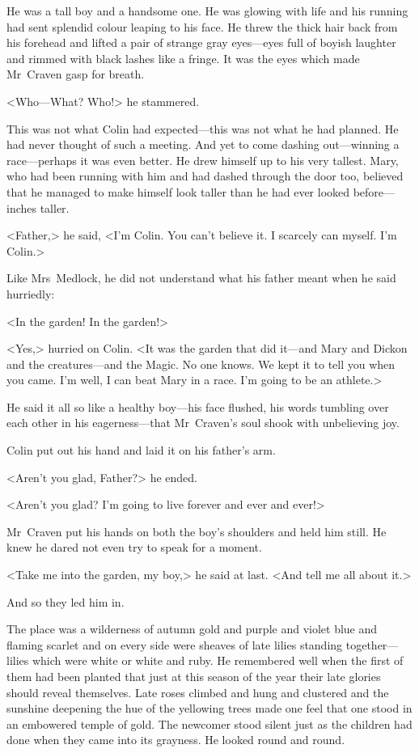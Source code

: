 He was a tall boy and a handsome one. He was glowing with life and his running had sent splendid colour leaping to his face. He threw the thick hair back from his forehead and lifted a pair of strange gray eyes—eyes full of boyish laughter and rimmed with black lashes like a fringe. It was the eyes which made Mr~Craven gasp for breath.

<Who—What? Who!> he stammered.

This was not what Colin had expected—this was not what he had planned. He had never thought of such a meeting. And yet to come dashing out—winning a race—perhaps it was even better. He drew himself up to his very tallest. Mary, who had been running with him and had dashed through the door too, believed that he managed to make himself look taller than he had ever looked before—inches taller.

<Father,> he said, <I'm Colin. You can't believe it. I scarcely can myself. I'm Colin.>

Like Mrs~Medlock, he did not understand what his father meant when he said hurriedly:

<In the garden! In the garden!>

<Yes,> hurried on Colin. <It was the garden that did it—and Mary and Dickon and the creatures—and the Magic. No one knows. We kept it to tell you when you came. I'm well, I can beat Mary in a race. I'm going to be an athlete.>

He said it all so like a healthy boy—his face flushed, his words tumbling over each other in his eagerness—that Mr~Craven's soul shook with unbelieving joy.

Colin put out his hand and laid it on his father's arm.

<Aren't you glad, Father?> he ended.

<Aren't you glad? I'm going to live forever and ever and ever!>

Mr~Craven put his hands on both the boy's shoulders and held him still. He knew he dared not even try to speak for a moment.

<Take me into the garden, my boy,> he said at last. <And tell me all about it.>

And so they led him in.

The place was a wilderness of autumn gold and purple and violet blue and flaming scarlet and on every side were sheaves of late lilies standing together—lilies which were white or white and ruby. He remembered well when the first of them had been planted that just at this season of the year their late glories should reveal themselves. Late roses climbed and hung and clustered and the sunshine deepening the hue of the yellowing trees made one feel that one stood in an embowered temple of gold. The newcomer stood silent just as the children had done when they came into its grayness. He looked round and round.

